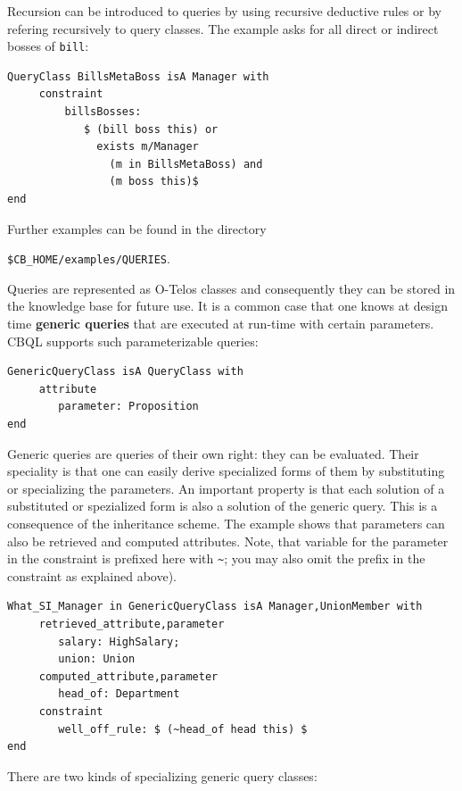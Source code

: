Recursion can be introduced to queries by using recursive deductive rules
or by refering recursively to query classes. The example asks for all
direct or indirect bosses of {\tt bill}:


{\small
\begin{verbatim}
QueryClass BillsMetaBoss isA Manager with
     constraint
         billsBosses:
            $ (bill boss this) or
              exists m/Manager
                (m in BillsMetaBoss) and
                (m boss this)$
end
\end{verbatim}
}


Further examples can be found in the directory

\begin{center}
\verb+$CB_HOME/examples/QUERIES+.
\end{center}

Queries are represented as O-Telos classes and consequently they can be
stored in the knowledge base for future use. It is a common case that one
knows at design time {\bf generic queries} that are executed at run-time with
certain parameters. CBQL supports such parameterizable queries:

{\small
\begin{verbatim}
GenericQueryClass isA QueryClass with
     attribute
        parameter: Proposition
end
\end{verbatim}
}

Generic queries are queries of their own right: they can be evaluated.
Their speciality is that one can easily derive specialized forms of them by
substituting or specializing the parameters. An important property is that each solution of
a substituted or spezialized form is also a solution of the generic query. This is a
consequence of the inheritance scheme. The example shows that parameters can
also be retrieved and computed attributes. Note, that variable
for the parameter in the constraint is prefixed here with \verb+~+; you may also
omit the prefix in the constraint as explained above).

{\small
\begin{verbatim}
What_SI_Manager in GenericQueryClass isA Manager,UnionMember with
     retrieved_attribute,parameter
        salary: HighSalary;
        union: Union
     computed_attribute,parameter
        head_of: Department
     constraint
        well_off_rule: $ (~head_of head this) $
end
\end{verbatim}
}

There are two kinds of specializing generic query classes:



